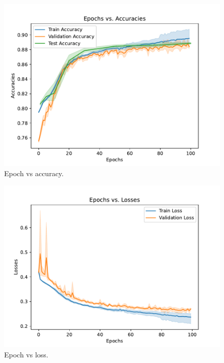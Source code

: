 \documentclass[sigplan,screen]{acmart}
\begin{document}
\begin{figure}[htb]
\centering\includegraphics[width=1.0\columnwidth]{images/epoch_vs_accuracy.pdf}
\caption{Epoch vs accuracy.}
\label{fig:epochs_vs_accuracy}
\end{figure}


\begin{figure}[htb]
\centering\includegraphics[width=1.0\columnwidth]{images/epoch_vs_loss.pdf}
\caption{Epoch vs loss.}
\label{fig:epochs_vs_accuracy}
\end{figure}
\end{document}
